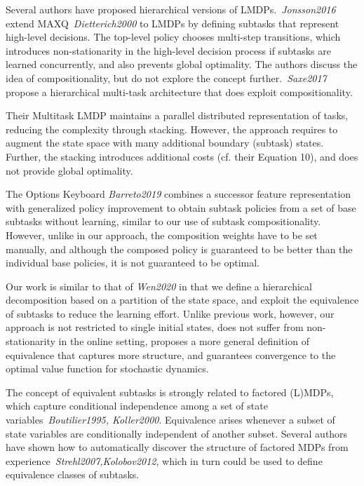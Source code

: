 Several authors have proposed hierarchical versions of LMDPs.~\textit{Jonsson2016} extend MAXQ~\textit{Dietterich2000} to LMDPs by defining subtasks that represent high-level decisions. The top-level policy chooses multi-step transitions, which introduces non-stationarity in the high-level decision process if subtasks are learned concurrently, and also prevents global optimality. The authors discuss the idea of compositionality, but do not explore the concept further.~\textit{Saxe2017} propose a hierarchical multi-task architecture that does exploit compositionality.

Their Multitask LMDP maintains a parallel distributed representation of tasks, reducing the complexity through stacking. However, the approach requires to augment the state space with many additional boundary (subtask) states. Further, the stacking introduces additional costs (cf. their Equation 10), and does not provide global optimality.

The Options Keyboard \textit{Barreto2019} combines a successor feature representation with generalized policy improvement to obtain subtask policies from a set of base subtasks without learning, similar to our use of subtask compositionality. However, unlike in our approach, the composition weights have to be set manually, and although the composed policy is guaranteed to be better than the individual base policies, it is not guaranteed to be optimal.


Our work is similar to that of \textit{Wen2020} in that we define a hierarchical decomposition based on a partition of the state space, and exploit the equivalence of subtasks to reduce the learning effort. Unlike previous work, however, our approach is not restricted to single initial states, does not suffer from non-stationarity in the online setting, proposes a more general definition of equivalence that captures more structure, and guarantees convergence to the optimal value function for stochastic dynamics.

The concept of equivalent subtasks is strongly related to factored (L)MDPs, which capture conditional independence among a set of state variables~\textit{Boutilier1995, Koller2000}. Equivalence arises whenever a subset of state variables are conditionally independent of another subset. Several authors have shown how to automatically discover the structure of factored MDPs from experience~\textit{Strehl2007,Kolobov2012}, which in turn could be used to define equivalence classes of subtasks.

